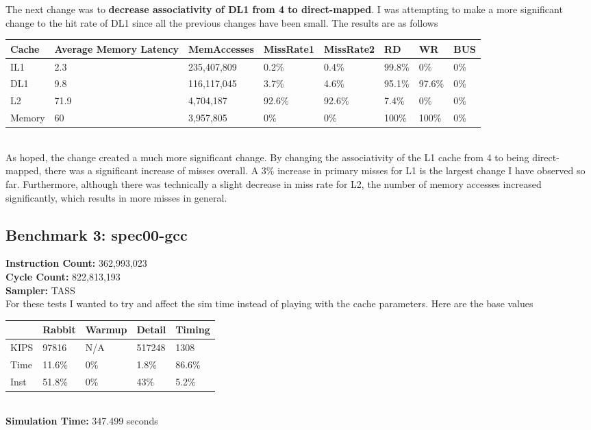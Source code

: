 \documentclass[12pt]{article}
\begin{document}
The next change was to \textbf{decrease associativity of DL1 from 4 to direct-mapped}. I was attempting to make a more significant change to the hit rate of DL1 since all the previous changes have been small. The results are as follows
\begin{table}[!h]
\centering
\begin{tabular}{|l|l|l|l|l|l|l|l|}
\hline
\rowcolor[HTML]{C0C0C0} 
Cache & Average Memory Latency & MemAccesses & MissRate1 & MissRate2 & RD & WR & BUS \\ \hline
IL1 & 2.3 & 235,407,809 & 0.2\% & 0.4\% & 99.8\% & 0\% & 0\% \\ \hline
DL1 & 9.8 & 116,117,045 & 3.7\% & 4.6\% & 95.1\% & 97.6\% & 0\% \\ \hline
L2 & 71.9 & 4,704,187 & 92.6\% & 92.6\% & 7.4\% & 0\% & 0\% \\ \hline
Memory & 60 & 3,957,805 & 0\% & 0\% & 100\% & 100\% & 0\% \\ \hline
\end{tabular}
\end{table}\\
As hoped, the change created a much more significant change. By changing the associativity of the L1 cache from 4 to being direct-mapped, there was a significant increase of misses overall. A 3\% increase in primary misses for L1 is the largest change I have observed so far. Furthermore, although there was technically a slight decrease in miss rate for L2, the number of memory accesses increased significantly, which results in more misses in general.
\newpage
\subsection*{Benchmark 3: spec00-gcc}
\textbf{Instruction Count:} 362,993,023\\
\textbf{Cycle Count:} 822,813,193\\
\textbf{Sampler:} TASS\\
For these tests I wanted to try and affect the sim time instead of playing with the cache parameters. Here are the base values
\begin{table}[!h]
\begin{tabular}{|l|l|l|l|l|}
\hline
\rowcolor[HTML]{C0C0C0} 
                             & Rabbit & Warmup & Detail & Timing \\ \hline
\cellcolor[HTML]{C0C0C0}KIPS & 97816  & N/A    & 517248 & 1308   \\ \hline
\cellcolor[HTML]{C0C0C0}Time & 11.6\% & 0\%    & 1.8\%  & 86.6\% \\ \hline
\cellcolor[HTML]{C0C0C0}Inst & 51.8\% & 0\%    & 43\%   & 5.2\%  \\ \hline
\end{tabular}
\end{table}\\
\textbf{Simulation Time:} 347.499 seconds\\
\end{document}

